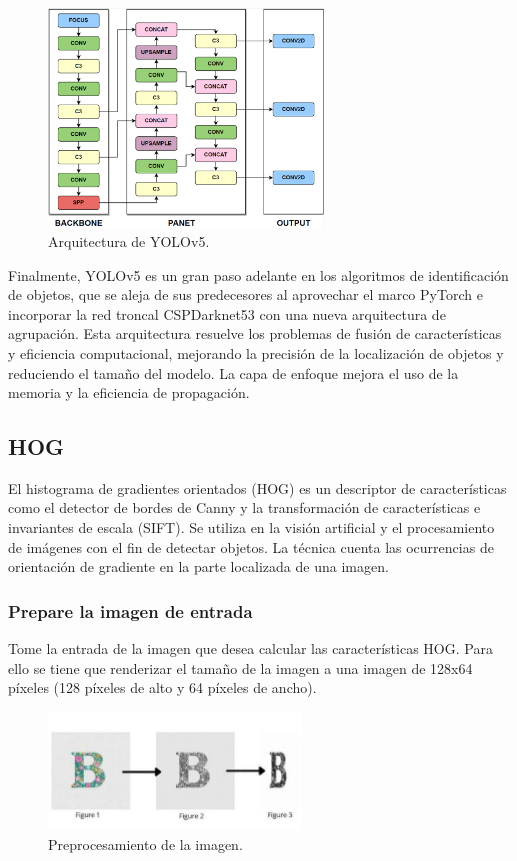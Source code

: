 \begin{figure}[H]
    \centering
    \includegraphics[width=0.65\textwidth]{2/2_teoria/figures/yoloV5.png} %
    \caption{Arquitectura de YOLOv5.}
    \label{fig:etiqueta_imagen} %
\end{figure}


Finalmente, YOLOv5 es un gran paso adelante en los algoritmos de identificación de objetos, que se aleja de sus predecesores al aprovechar el marco PyTorch e incorporar la red troncal CSPDarknet53 con una nueva arquitectura de agrupación. Esta arquitectura resuelve los problemas de fusión de características y eficiencia computacional, mejorando la precisión de la localización de objetos y reduciendo el tamaño del modelo. La capa de enfoque mejora el uso de la memoria y la eficiencia de propagación.

\subsection{HOG}
El histograma de gradientes orientados (HOG) es un descriptor de características como el detector de bordes de Canny y la transformación de características e invariantes de escala (SIFT). Se utiliza en la visión artificial y el procesamiento de imágenes con el fin de detectar objetos. La técnica cuenta las ocurrencias de orientación de gradiente en la parte localizada de una imagen.

\subsubsection{Prepare la imagen de entrada}
Tome la entrada de la imagen que desea calcular las características HOG. Para ello se tiene que renderizar el tamaño de la imagen a una imagen de 128x64 píxeles (128 píxeles de alto y 64 píxeles de ancho).
\begin{figure}[H]
    \centering
    \includegraphics[width=0.60\textwidth]{2/2_teoria/figures/Hog1.jpeg} %
    \caption{Preprocesamiento de la imagen.}
    \label{fig:etiqueta_imagen} %
\end{figure}

